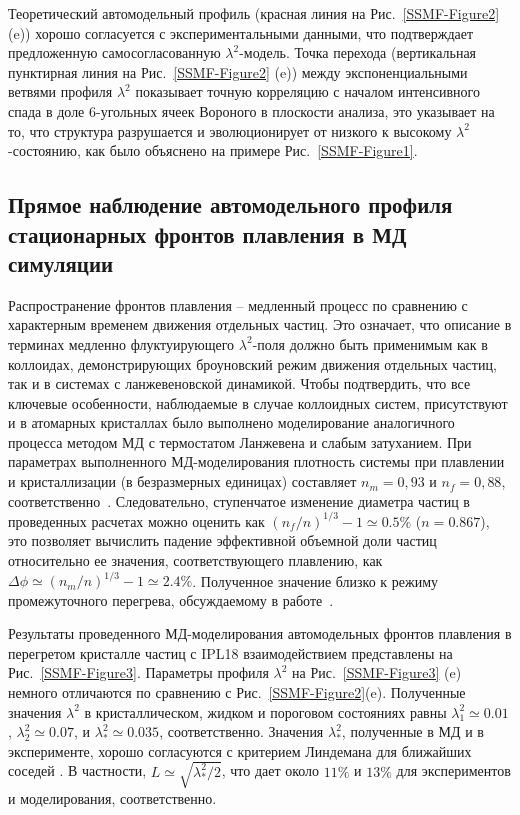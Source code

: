 Теоретический автомодельный профиль (красная линия на Рис.~\ref{SSMF-Figure2} (e)) хорошо согласуется с экспериментальными данными, что подтверждает предложенную самосогласованную $\lambda^2$-модель.
Точка перехода (вертикальная пунктирная линия на Рис.~\ref{SSMF-Figure2} (e)) между экспоненциальными ветвями профиля $ \lambda^2$ показывает точную корреляцию с началом интенсивного спада в доле 6-угольных ячеек Вороного в плоскости анализа, это указывает на то, что структура разрушается и эволюционирует от низкого к высокому $\lambda^2$-состоянию, как было объяснено на примере Рис.~\ref{SSMF-Figure1}.

\subsection{Прямое наблюдение автомодельного профиля стационарных фронтов плавления в МД симуляции}
\label{SSMF-Results-MD}

Распространение фронтов плавления -- медленный процесс по сравнению с характерным временем движения отдельных частиц.
Это означает, что описание в терминах медленно флуктуирующего $\lambda^2$-поля должно быть применимым как в коллоидах, демонстрирующих броуновский режим движения отдельных частиц, так и в системах с ланжевеновской динамикой.
Чтобы подтвердить, что все ключевые особенности, наблюдаемые в случае коллоидных систем, присутствуют и в атомарных кристаллах было выполнено моделирование аналогичного процесса методом МД с термостатом Ланжевена и слабым затуханием.
При параметрах выполненного МД-моделирования плотность системы при плавлении и кристаллизации (в безразмерных единицах) составляет $ n_m = 0,93 $ и $ n_f = 0,88 $, соответственно~\cite{10.1080/00268979500100911}.
Следовательно, ступенчатое изменение диаметра частиц в проведенных расчетах можно оценить как $ (n_f / n) ^ {1/3} -1 \simeq 0.5 \% $ ($ n = 0.867 $), это позволяет вычислить падение эффективной объемной доли частиц относительно ее значения, соответствующего плавлению, как
$\Delta \phi  \simeq (n_m/n)^{1/3}-1\simeq 2.4\%$.
Полученное значение близко к режиму промежуточного перегрева, обсуждаемому в работе~\cite{10.1038/ncomms7942}.

Результаты проведенного МД-моделирования автомодельных фронтов плавления в перегретом кристалле частиц с IPL18 взаимодействием представлены на Рис.~\ref{SSMF-Figure3}.
Параметры профиля $\lambda^2$ на Рис.~\ref{SSMF-Figure3} (e) немного отличаются по сравнению с Рис.~\ref{SSMF-Figure2}(e).
Полученные значения $\lambda^2$ в кристаллическом, жидком и пороговом состояниях равны $\lambda_1^2 \simeq 0.01$, $\lambda_2^2 \simeq 0.07$, и $\lambda_\ast^2 \simeq 0.035$, соответственно.
Значения $\lambda_\ast^2$, полученные в МД и в эксперименте, хорошо согласуются с критерием Линдемана для ближайших соседей \cite{10.1016/0375-9601(85)90617-6}.
В частности, $L\simeq \sqrt{\lambda_\ast ^ 2/2} $, что дает около $ 11 \% $ и $ 13 \% $ для экспериментов и моделирования, соответственно.

